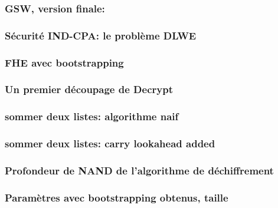 \documentclass[15pt]{beamer}
\begin{document}

\begin{frame} 
\frametitle{GSW, version finale:}
\end{frame} 


\begin{frame} 
\frametitle{Sécurité IND-CPA: le problème DLWE}
\end{frame} 


\begin{frame} 
\frametitle{FHE avec bootstrapping}
\end{frame} 


\begin{frame} 
\frametitle{Un premier découpage de Decrypt}
\end{frame} 


\begin{frame} 
\frametitle{sommer deux listes: algorithme naif}
\end{frame} 
    

\begin{frame} 
\frametitle{sommer deux listes: carry lookahead added}
\end{frame} 

\begin{frame} 
\frametitle{Profondeur de NAND de l'algorithme de déchiffrement}
\end{frame} 


\begin{frame} 
\frametitle{Paramètres avec bootstrapping obtenus, taille}
\end{frame} 
\end{document}
